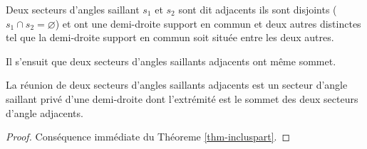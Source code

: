\begin{defi}
Deux secteurs d'angles saillant $s_1$ et $s_2$ sont dit adjacents \ssi ils sont disjoints ($s_1 \cap s_2 = \varnothing$) et ont une demi-droite support en commun et deux autres distinctes tel que la demi-droite support en commun soit située entre les deux autres. 
\end{defi}
\begin{rema}
    Il s'ensuit que deux secteurs d'angles saillants adjacents ont même sommet. 
\end{rema}
\begin{cor}
    La réunion de deux secteurs d'angles saillants adjacents est un secteur d'angle saillant privé d'une demi-droite dont l'extrémité est le sommet des deux secteurs d'angle adjacents.
\begin{proof}
    Conséquence immédiate du Théoreme \ref{thm-incluspart}.
\end{proof}
\end{cor}
